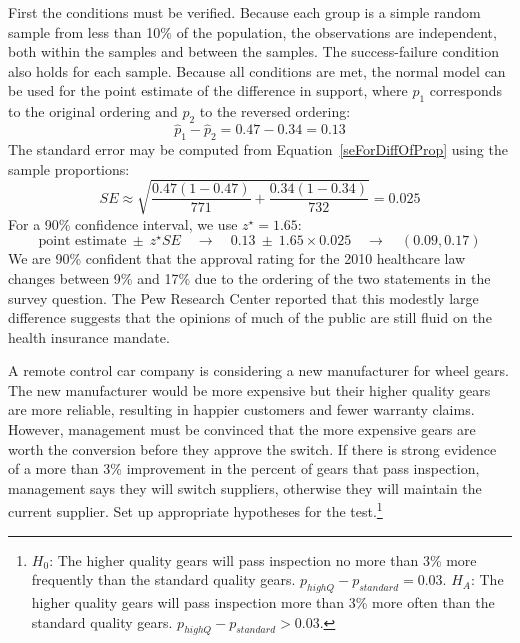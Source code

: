 \begin{example}
First the conditions must be verified. Because each group is a simple random sample from less than 10\% of the population, the observations are independent, both within the samples and between the samples. The success-failure condition also holds for each sample. Because all conditions are met, the normal model can be used for the point estimate of the difference in support, where $p_1$ corresponds to the original ordering and $p_2$ to the reversed ordering:
$$\hat{p}_{1} - \hat{p}_{2} = 0.47 - 0.34 = 0.13$$
The standard error may be computed from Equation~\eqref{seForDiffOfProp} using the sample proportions:
$$SE \approx \sqrt{\frac{0.47(1-0.47)}{771} + \frac{0.34(1-0.34)}{732}} = 0.025$$
For a 90\% confidence interval, we use $z^{\star} = 1.65$:
$$\text{point estimate} \ \pm\ z^{\star}SE \quad \to \quad 0.13 \ \pm\ 1.65 \times  0.025 \quad \to \quad (0.09, 0.17)$$
We are 90\% confident that the approval rating for the 2010 healthcare law changes between 9\% and 17\% due to the ordering of the two statements in the survey question. The Pew Research Center reported that this modestly large difference suggests that the opinions of much of the public are still fluid on the health insurance mandate.
\end{example}

\begin{exercise}\label{carWheelGearManufacturer}
A remote control car company is considering a new manufacturer for wheel gears. The new manufacturer would be more expensive but their higher quality gears are more reliable, resulting in happier customers and fewer warranty claims. However, management must be convinced that the more expensive gears are worth the conversion before they approve the switch. If there is strong evidence of a more than 3\% improvement in the percent of gears that pass inspection, management says they will switch suppliers, otherwise they will maintain the current supplier. Set up appropriate hypotheses for the test.\footnote{$H_0$: The higher quality gears will pass inspection no more than 3\% more frequently than the standard quality gears. $p_{highQ} - p_{standard} = 0.03$. $H_A$: The higher quality gears will pass inspection more than 3\% more often than the standard quality gears. $p_{highQ} - p_{standard} > 0.03$.}
\end{exercise}

